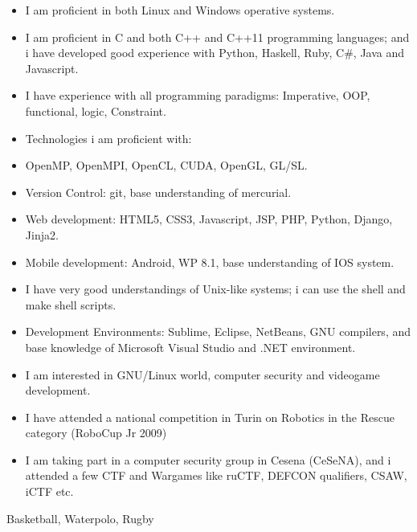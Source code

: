\documentclass[helvetica,narrow,openbib,notitle,flagCMYK]{europecv}
\begin{document}
\begin{europecv}
	 {
		\begin{itemize}
			\item I am proficient in both Linux and Windows operative systems.
			\item I am proficient in C and both C++ and C++11 programming languages; and i have developed good experience with Python, Haskell, Ruby, C\#, Java and Javascript.
			\item I have experience with all programming paradigms: Imperative, OOP, functional, logic, Constraint.
			\item Technologies i am proficient with:
			\item OpenMP, OpenMPI, OpenCL, CUDA, OpenGL, GL/SL.
			\item Version Control: git, base understanding of mercurial.
			\item Web development: HTML5, CSS3, Javascript, JSP, PHP, Python, Django, Jinja2.
			\item Mobile development: Android, WP 8.1, base understanding of IOS system.
			\item I have very good understandings of Unix-like systems; i can use the shell and make shell scripts.
			\item Development Environments: Sublime, Eclipse, NetBeans, GNU compilers, and base knowledge of Microsoft Visual Studio and .NET environment.
		\end{itemize}
	}
	 {
		\begin{itemize}
			\item I am interested in GNU/Linux world, computer security and videogame development. 
			\item I have attended a national competition in Turin on Robotics in the Rescue category (RoboCup Jr 2009) 
			\item I am taking part in a computer security group in Cesena (CeSeNA), and i attended a few CTF and Wargames like ruCTF, DEFCON qualifiers, CSAW, iCTF etc.
		\end{itemize}
	}
	 {Basketball, Waterpolo, Rugby}


	\end{europecv}
\end{document}

